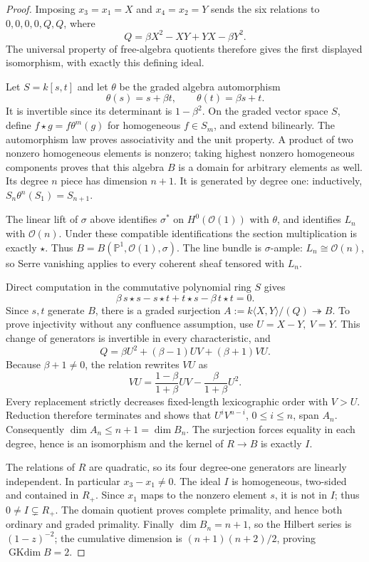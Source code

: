 \documentclass[11pt]{article}
\newcommand{\PP}{\mathbb P}
\newcommand{\OO}{\mathcal O}
\newcommand{\GK}{\operatorname{GKdim}}
\begin{document}
\begin{proof}
Imposing \(x_3=x_1=X\) and \(x_4=x_2=Y\) sends the six relations to
\(0,0,0,0,Q,Q\), where
\[
 Q=\beta X^2-XY+YX-\beta Y^2.
\]
The universal property of free-algebra quotients therefore gives the
first displayed isomorphism, with exactly this defining ideal.

Let \(S=k[s,t]\) and let \(\theta\) be the graded algebra automorphism
\[
 \theta(s)=s+\beta t,\qquad \theta(t)=\beta s+t.
\]
It is invertible since its determinant is \(1-\beta^2\).
On the graded vector space \(S\), define
\(f\star g=f\theta^m(g)\) for homogeneous \(f\in S_m\), and extend
bilinearly. The automorphism law proves associativity and the unit
property. A product of two nonzero homogeneous elements is nonzero;
taking highest nonzero homogeneous components proves that this
algebra \(B\) is a domain for arbitrary elements as well.
Its degree \(n\) piece has dimension \(n+1\).
It is generated by degree one: inductively,
\(S_n\theta^n(S_1)=S_{n+1}\).

The linear lift of \(\sigma\) above identifies \(\sigma^*\) on
\(H^0(\OO(1))\) with \(\theta\), and identifies \(L_n\) with \(\OO(n)\).
Under these compatible identifications the section multiplication is
exactly \(\star\). Thus \(B=B(\PP^1,\OO(1),\sigma)\).
The line bundle is \(\sigma\)-ample: \(L_n\cong\OO(n)\), so Serre
vanishing applies to every coherent sheaf tensored with \(L_n\).

Direct computation in the commutative polynomial ring \(S\) gives
\[
 \beta\,s\star s-s\star t+t\star s-\beta\,t\star t=0.
\]
Since \(s,t\) generate \(B\), there is a graded surjection
\(A:=k\langle X,Y\rangle/(Q)\twoheadrightarrow B\).
To prove injectivity without any confluence assumption, use
\(U=X-Y,\ V=Y\). This change of generators is invertible in every
characteristic, and
\[
 Q=\beta U^2+(\beta-1)UV+(\beta+1)VU.
\]
Because \(\beta+1\ne0\), the relation rewrites \(VU\) as
\[
 VU=\frac{1-\beta}{1+\beta}UV-\frac{\beta}{1+\beta}U^2.
\]
Every replacement strictly decreases fixed-length lexicographic order
with \(V>U\). Reduction therefore terminates and shows that
\(U^iV^{n-i}\), \(0\le i\le n\), span \(A_n\).
Consequently \(\dim A_n\le n+1=\dim B_n\). The surjection forces equality
in each degree, hence is an isomorphism and the kernel of \(R\to B\)
is exactly \(I\).

The relations of \(R\) are quadratic, so its four degree-one generators
are linearly independent. In particular \(x_3-x_1\ne0\).
The ideal \(I\) is homogeneous, two-sided and contained in \(R_+\).
Since \(x_1\) maps to the nonzero element \(s\), it is not in \(I\);
thus \(0\ne I\subsetneq R_+\). The domain quotient proves complete
primality, and hence both ordinary and graded primality.
Finally \(\dim B_n=n+1\), so the Hilbert series is \((1-z)^{-2}\);
the cumulative dimension is \((n+1)(n+2)/2\), proving \(\GK B=2\).
\end{proof}
\end{document}
